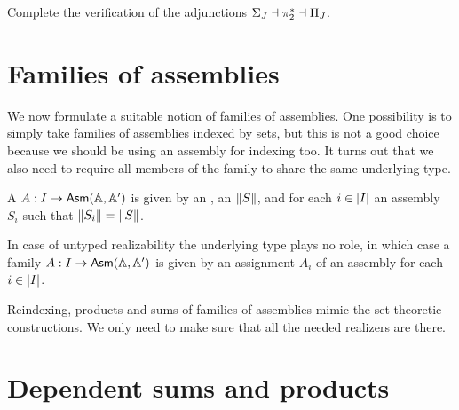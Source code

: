 \begin{exercise}
  Complete the verification of the adjunctions $\Sigma_J \dashv \invim{\pi_2} \dashv \Pi_J$.
\end{exercise}


\section{Families of assemblies}
\label{sec:families-assemblies}

We now formulate a suitable notion of families of assemblies.
%
One possibility is to simply take families of assemblies indexed by sets, but this is not a good choice because we should be using an assembly for indexing too. It turns out that we also need to require all members of the family to share the same underlying type.

\begin{definition}
  A  $A : I \to \AsmA$ is given by an
  , an  $\T{S}$, and for each
  $i \in \S{I}$ an assembly $S_i$ such that $\T{S_i} = \T{S}$.
\end{definition}

In case of untyped realizability the underlying type plays no role, in which case a family $A : I \to \AsmA$ is given by an assignment $A_i$ of an assembly for each $i \in \S{I}$.

Reindexing, products and sums of families of assemblies mimic the set-theoretic constructions. We only need to make sure that all the needed realizers are there.

\section{Dependent sums and products}
\label{sec:depend-sums-prod}


